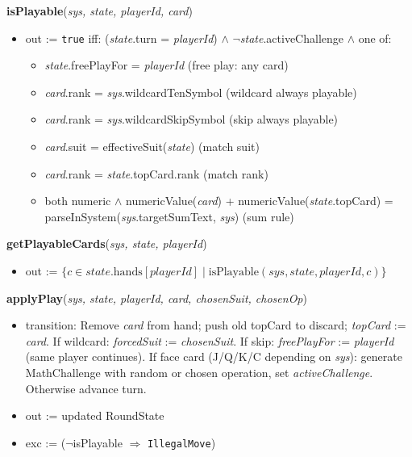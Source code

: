 \documentclass[12pt, titlepage]{article}
\begin{document}
\noindent\textbf{isPlayable}(\textit{sys, state, playerId, card})
\begin{itemize}
    \item out := \texttt{true} iff: (\textit{state}.turn = \textit{playerId}) $\wedge$ $\neg$\textit{state}.activeChallenge $\wedge$ one of:
    \begin{itemize}
        \item \textit{state}.freePlayFor = \textit{playerId} (free play: any card)
        \item \textit{card}.rank = \textit{sys}.wildcardTenSymbol (wildcard always playable)
        \item \textit{card}.rank = \textit{sys}.wildcardSkipSymbol (skip always playable)
        \item \textit{card}.suit = effectiveSuit(\textit{state}) (match suit)
        \item \textit{card}.rank = \textit{state}.topCard.rank (match rank)
        \item both numeric $\wedge$ numericValue(\textit{card}) + numericValue(\textit{state}.topCard) = parseInSystem(\textit{sys}.targetSumText, \textit{sys}) (sum rule)
    \end{itemize}
\end{itemize}

\noindent\textbf{getPlayableCards}(\textit{sys, state, playerId})
\begin{itemize}
    \item out := $\{c \in \textit{state}.\text{hands}[\textit{playerId}] \mid \text{isPlayable}(\textit{sys}, \textit{state}, \textit{playerId}, c)\}$
\end{itemize}

\noindent\textbf{applyPlay}(\textit{sys, state, playerId, card, chosenSuit, chosenOp})
\begin{itemize}
    \item transition: Remove \textit{card} from hand; push old topCard to discard; \textit{topCard} := \textit{card}. If wildcard: \textit{forcedSuit} := \textit{chosenSuit}. If skip: \textit{freePlayFor} := \textit{playerId} (same player continues). If face card (J/Q/K/C depending on \textit{sys}): generate MathChallenge with random or chosen operation, set \textit{activeChallenge}. Otherwise advance turn.
    \item out := updated RoundState
    \item exc := ($\neg$isPlayable $\Rightarrow$ \texttt{IllegalMove})
\end{itemize}
\end{document}
